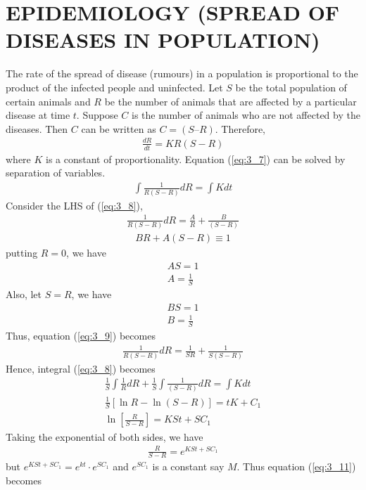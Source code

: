 \documentclass[11pt]{report}
\newcommand{\sps}{\\[0.2cm]}
\newcommand{\refn}[1]{(\ref{#1})}
\newcommand{\refx}[1]{\refn{eq:#1}}
\begin{document}
	\section{EPIDEMIOLOGY (SPREAD OF DISEASES IN POPULATION)}
	The rate of the spread of disease (rumours) in a population is proportional to the product of the infected people and uninfected. Let $S$ be the total population of certain animals and $R$ be the number of animals that are affected by a particular disease at time $t$. Suppose $C$ is the number of animals who are not affected by the diseases. Then $C$ can be written as $C = (S – R)$. Therefore,
	\begin{eqnarray}
		\frac{dR}{dt} = KR(S-R)\label{eq:3_7}
	\end{eqnarray}
	where $K$ is a constant of proportionality. Equation \refx{3_7} can be solved by separation of variables.
	\begin{eqnarray}
		\int\frac{1}{R(S-R)}dR = \int Kdt\label{eq:3_8}
	\end{eqnarray}
	Consider the LHS of \refx{3_8}, 
	\begin{eqnarray}
		\frac{1}{R(S-R)}dR = \frac{A}{R}+\frac{B}{(S-R)}\label{eq:3_9}
	\end{eqnarray}
	\begin{eqnarray*}
		BR + A(S-R) \equiv 1
	\end{eqnarray*}
	putting $R=0$, we have
	\begin{eqnarray*}
		AS = 1 \\
		A = \frac{1}{S}
	\end{eqnarray*}
	Also, let $S=R$, we have
	\begin{eqnarray*}
		BS = 1\\
		B = \frac{1}{S}
	\end{eqnarray*}
	Thus, equation \refx{3_9} becomes
	\begin{eqnarray}
		\frac{1}{R(S-R)}dR = \frac{1}{SR}+\frac{1}{S(S-R)}\label{eq:3_10}
	\end{eqnarray}
	Hence, integral \refx{3_8} becomes
	\begin{eqnarray*}
		\frac{1}{S}\int\frac{1}{R}dR + \frac{1}{S}\int\frac{1}{(S-R)}dR = \int Kdt\sps
		\frac{1}{S}\left[\ln R - \ln(S-R)\right] = tK + C_1\sps
		\ln\left[\frac{R}{S-R}\right] = KSt + SC_1
	\end{eqnarray*}
	Taking the exponential of both sides, we have
	\begin{eqnarray}
		\frac{R}{S-R} = e^{KSt + SC_1}\label{eq:3_11}
	\end{eqnarray}
	but $e^{KSt+SC_1} = e^{kt}\cdot e^{SC_1}$ and $e^{SC_1}$ is a constant say $M$. Thus equation \refx{3_11} becomes
\end{document}
